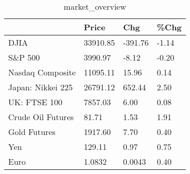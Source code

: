 \documentclass{article}%
\begin{document}
%


\begin{table}[htbp]%
\caption{market\_overview}%
\centering%
\begin{adjustbox}{width=1\textwidth}%
\begin{tabular}{llll}
\toprule
                  &    Price &     Chg &  \%Chg \\
\midrule
             DJIA & 33910.85 & -391.76 & -1.14 \\
          S\&P 500 &  3990.97 &   -8.12 & -0.20 \\
 Nasdaq Composite & 11095.11 &   15.96 &  0.14 \\
Japan: Nikkei 225 & 26791.12 &  652.44 &  2.50 \\
     UK: FTSE 100 &  7857.03 &    6.00 &  0.08 \\
Crude Oil Futures &    81.71 &    1.53 &  1.91 \\
     Gold Futures &  1917.60 &    7.70 &  0.40 \\
              Yen &   129.11 &    0.97 &  0.75 \\
             Euro &   1.0832 &  0.0043 &  0.40 \\
\bottomrule
\end{tabular}
%
\end{adjustbox}%
\end{table}

%
\end{document}
